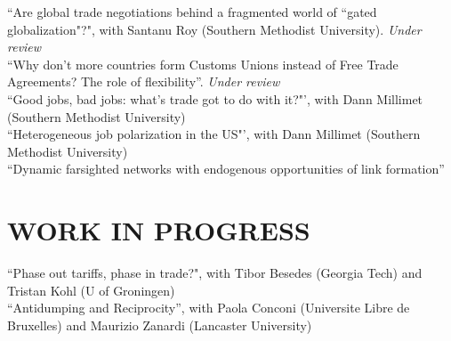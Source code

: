 \documentclass[11pt]{res}
\begin{document}
\begin{resume}
\phantom{.}\vspace{.05cm}
{``Are global trade negotiations behind a fragmented world of ``gated globalization"?"}, with Santanu Roy (Southern Methodist University). \emph{Under review}\vspace{1.5mm}\\
{``Why don't more countries form Customs Unions instead of Free Trade Agreements? The role of flexibility''}.\emph{ Under review} \vspace{1.5mm}\\
{``Good jobs, bad jobs: what's trade got to do with it?"'}, with Dann Millimet (Southern Methodist University)\vspace{1.5mm}\\
{``Heterogeneous job polarization in the US"'}, with Dann Millimet (Southern Methodist University)\vspace{1.5mm}\\
{ ``Dynamic farsighted networks with endogenous opportunities of link formation''} \vspace{1.5mm}\\

\section{WORK IN PROGRESS}\vspace{1.5mm}
``Phase out tariffs, phase in trade?", with Tibor Besedes (Georgia Tech) and Tristan Kohl (U of Groningen) \vspace{1.5mm}\\
``Antidumping and Reciprocity'', with Paola Conconi (Universite Libre de Bruxelles) and Maurizio Zanardi (Lancaster University)\\


\end{resume}
\end{document}
